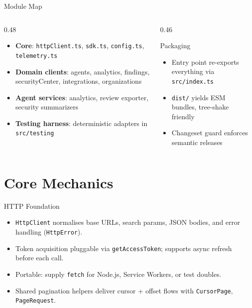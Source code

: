 \documentclass[aspectratio=169]{beamer}
\begin{document}
\begin{frame}{Module Map}
  \begin{columns}
    \begin{column}{0.48\textwidth}
      \begin{itemize}
        \item \textbf{Core}: \texttt{httpClient.ts}, \texttt{sdk.ts}, \texttt{config.ts}, \texttt{telemetry.ts}
        \item \textbf{Domain clients}: agents, analytics, findings, securityCenter, integrations, organizations
        \item \textbf{Agent services}: analytics, review exporter, security summarizers
        \item \textbf{Testing harness}: deterministic adapters in \texttt{src/testing}
      \end{itemize}
    \end{column}
    \begin{column}{0.46\textwidth}
      \begin{block}{Packaging}
        \begin{itemize}
          \item Entry point re-exports everything via \texttt{src/index.ts}
          \item \texttt{dist/} yields ESM bundles, tree-shake friendly
          \item Changeset guard enforces semantic releases
        \end{itemize}
      \end{block}
    \end{column}
  \end{columns}
\end{frame}

\section{Core Mechanics}

\begin{frame}{HTTP Foundation}
  \begin{itemize}
    \item \texttt{HttpClient} normalises base URLs, search params, JSON bodies, and error handling (\texttt{HttpError}).
    \item Token acquisition pluggable via \texttt{getAccessToken}; supports async refresh before each call.
    \item Portable: supply \texttt{fetch} for Node.js, Service Workers, or test doubles.
    \item Shared pagination helpers deliver cursor + offset flows with \texttt{CursorPage}, \texttt{PageRequest}.
  \end{itemize}
\end{frame}
\end{document}
